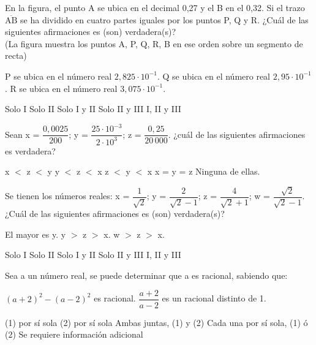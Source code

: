\documentclass[pagina vacia]{srs}
\begin{document}
\begin{preguntas}[after-item-skip=1cm]
\pregunta En la figura, el punto A se ubica en el decimal 0,27 y el B en el 0,32. Si el trazo \(\overline{\text{AB}}\) se ha dividido en cuatro partes iguales por los puntos P, Q y R. ¿Cuál de las siguientes afirmaciones es (son) verdadera(s)? \\ (La figura muestra los puntos A, P, Q, R, B en ese orden sobre un segmento de recta)
\begin{verticali}
\alternativa P se ubica en el número real \(2,825 \cdot 10^{-1}\).
\alternativa Q se ubica en el número real \(2,95 \cdot 10^{-1}\).
\alternativa R se ubica en el número real \(3,075 \cdot 10^{-1}\).
\end{verticali}
\begin{vertical}
\alternativa Solo I
\alternativa Solo II
\alternativa Solo I y II
\alternativa Solo II y III
\alternativa I, II y III
\end{vertical}

\pregunta Sean x = \( \dfrac{0,0025}{200} \); y = \( \dfrac{25 \cdot 10^{-3}}{2 \cdot 10^3} \); z = \( \dfrac{0,25}{20\,000} \). ¿cuál de las siguientes afirmaciones es verdadera?
\begin{vertical}
\alternativa x \(<\) z \(<\) y
\alternativa y \(<\) z \(<\) x
\alternativa z \(<\) y \(<\) x
\alternativa x = y = z
\alternativa Ninguna de ellas.
\end{vertical}

\pregunta Se tienen los números reales: x = \( \dfrac{1}{\sqrt{2}} \); y = \( \dfrac{2}{\sqrt{2}-1} \); z = \( \dfrac{4}{\sqrt{2}+1} \); w = \( \dfrac{\sqrt{2}}{\sqrt{2}-1} \). ¿Cuál de las siguientes afirmaciones es (son) verdadera(s)?
\begin{verticali}
\alternativa El mayor es y.
\alternativa y \(>\) z \(>\) x.
\alternativa w \(>\) z \(>\) x.
\end{verticali}
\begin{vertical}
\alternativa Solo I
\alternativa Solo II
\alternativa Solo I y II
\alternativa Solo II y III
\alternativa I, II y III
\end{vertical}

\pregunta Sea a un número real, se puede determinar que a es racional, sabiendo que:
\begin{verticaln}
\alternativa \( \left(a+2\right)^2 - \left(a-2\right)^2 \) es racional.
\alternativa \( \dfrac{a+2}{a-2} \) es un racional distinto de 1.
\end{verticaln}
\begin{vertical}
\alternativa (1) por sí sola
\alternativa (2) por sí sola
\alternativa Ambas juntas, (1) y (2)
\alternativa Cada una por sí sola, (1) ó (2)
\alternativa Se requiere información adicional
\end{vertical}


\end{preguntas}
\end{document}
